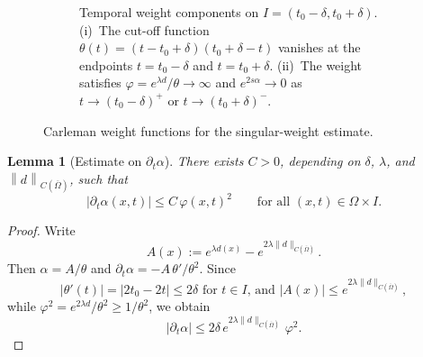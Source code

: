 \documentclass[12pt]{amsart}
\theoremstyle{plain}
\newtheorem{lemma}{Lemma}[section]
\theoremstyle{definition}
\theoremstyle{remark}
\newcommand{\p}{\partial}
\newcommand{\norm}[1]{\left\lVert#1\right\rVert}
\newcommand{\Om}{\Omega}
\begin{document}
\begin{figure}[htbp]
\begin{subfigure}[t]{0.62\textwidth}
\caption{Temporal weight components on $I=(t_0-\delta,t_0+\delta)$.
(i)~The cut-off function $\theta(t)=(t-t_0+\delta)(t_0+\delta-t)$
vanishes at the endpoints $t=t_0-\delta$ and $t=t_0+\delta$.
(ii)~The weight satisfies $\varphi=e^{\lambda d}/\theta\to\infty$ and $e^{2s\alpha}\to 0$ as
$t\to (t_0-\delta)^+$ or $t\to (t_0+\delta)^-$.}
\label{fig:singular-weight}
\end{subfigure}

\caption{Carleman weight functions for the singular-weight estimate.}
\label{fig:weights}
\end{figure}

\begin{lemma}[Estimate on $\p_t\alpha$]\label{lem:dtalpha}
There exists $C>0$, depending on $\delta$, $\lambda$, and
$\norm{d}_{C(\overline\Om)}$, such that
\begin{equation}\label{eq:dtalpha}
|\partial_t\alpha(x,t)|\le C\,\varphi(x,t)^2
\qquad\text{for all }(x,t)\in\Omega\times I.
\end{equation}
\end{lemma}

\begin{proof}
Write 
$$
A(x):=e^{\lambda d(x)}-e^{2\lambda\|d\|_{C(\overline\Om)}}.
$$
Then 
$\alpha=A/\theta$ and $\p_t\alpha = -A\,\theta'/\theta^2.$
Since $$|\theta'(t)|=|2t_0-2t|\le 2\delta \text{ for } t\in I \text{, and }
|A(x)|\le e^{2\lambda\|d\|_{C(\overline\Om)}},$$ 
while
$\varphi^2=e^{2\lambda d}/\theta^2\ge 1/\theta^2$, we obtain
$$|\p_t\alpha|\le 2\delta\,
e^{2\lambda\|d\|_{C(\overline\Om)}}\,\varphi^2.$$
\end{proof}
\end{document}
